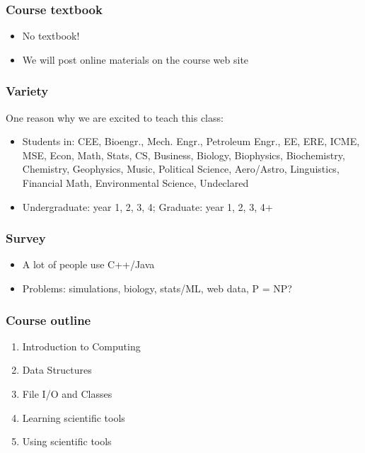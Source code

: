 \documentclass{beamer}
\begin{document}
\begin{frame}
\frametitle{Course textbook}

\begin{itemize}
\setlength{\itemsep}{0.2in}
\item{No textbook!}
\item{We will post online materials on the course web site}
\end{itemize}

\end{frame}


\begin{frame}
\frametitle{Variety}
One reason why we are excited to teach this class:

\begin{itemize}
\item{Students in: CEE, Bioengr., Mech. Engr., Petroleum Engr., EE, ERE, ICME, MSE, Econ, Math, Stats, CS, Business, Biology, Biophysics, Biochemistry, Chemistry, Geophysics, Music, Political Science, Aero/Astro, Linguistics, Financial Math, Environmental Science, Undeclared}
\item{Undergraduate: year 1, 2, 3, 4; Graduate: year 1, 2, 3, 4+}
\end{itemize}

\end{frame}

\begin{frame}
\frametitle{Survey}

\begin{itemize}
\setlength{\itemsep}{0.2in}
\item{A lot of people use C++/Java}
\item{Problems: simulations, biology, stats/ML, web data, P = NP?}
\end{itemize}


\end{frame}


\begin{frame}
\frametitle{Course outline}

\begin{enumerate}
\setlength{\itemsep}{0.2in}

\item{Introduction to Computing}
\item{Data Structures}
\item{File I/O and Classes}
\item{Learning scientific tools}
\item{Using scientific tools}

\end{enumerate}

\end{frame}
\end{document}
